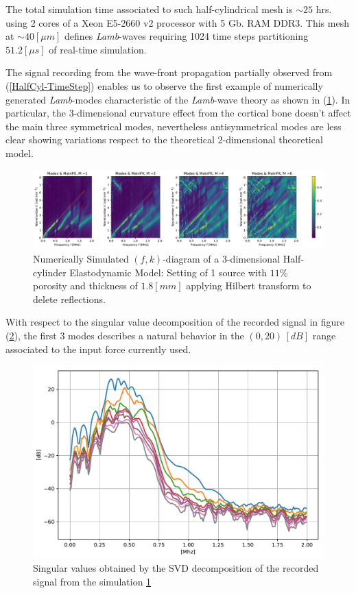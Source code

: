 \begin{rem}
The total simulation time associated to such half-cylindrical mesh is $\sim 25$ hrs. using 2 cores of a Xeon E5-2660 v2 processor with 5 Gb. RAM DDR3. This mesh at $\sim 40 [\mu m]$ defines \textit{Lamb}-waves requiring 1024 time steps partitioning $51.2 [\mu s]$ of real-time simulation. 
\end{rem}

The signal recording from the wave-front propagation partially observed from (\ref{HalfCyl-TimeStep}) enables us to observe the first example of numerically generated \textit{Lamb}-modes characteristic of the \textit{Lamb}-wave theory as shown in (\ref{FK-Cyl-DiagramS1P11M18}). In particular, the 3-dimensional curvature effect from the cortical bone doesn't affect the main three symmetrical modes, nevertheless antisymmetrical modes are less clear showing variations respect to the theoretical 2-dimensional theoretical model.
\begin{figure}[!h]
	\centering
	\includegraphics[width=\textwidth]{images/ClusterSim/3DCylTimeP11TransIsoFKW18.pdf}
	\caption{Numerically Simulated $(f,k)$-diagram of a 3-dimensional Half-cylinder Elastodynamic Model: Setting of 1 source with $11\%$ porosity and thickness of $1.8 [mm]$ applying Hilbert transform to delete reflections.}
	\label{FK-Cyl-DiagramS1P11M18}
\end{figure} 
With respect to the singular value decomposition of the recorded signal in figure (\ref{SVD-Cyl-S1P11M18}), the first 3 modes describes a natural behavior in the $(0, 20) \, [dB]$ range associated to the input force currently used.
\begin{figure}[!h]  
	\centering
	\includegraphics[scale=.5]{images/ClusterSim/3DCylTimeP11TransIsoFKW18_SV.pdf}
	\caption{Singular values obtained by the SVD decomposition of the recorded signal from the simulation \ref{FK-Cyl-DiagramS1P11M18}}
	\label{SVD-Cyl-S1P11M18}
\end{figure}


